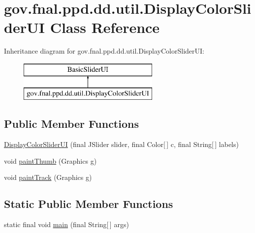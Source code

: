 \hypertarget{classgov_1_1fnal_1_1ppd_1_1dd_1_1util_1_1DisplayColorSliderUI}{\section{gov.\-fnal.\-ppd.\-dd.\-util.\-Display\-Color\-Slider\-U\-I Class Reference}
\label{classgov_1_1fnal_1_1ppd_1_1dd_1_1util_1_1DisplayColorSliderUI}
}
Inheritance diagram for gov.\-fnal.\-ppd.\-dd.\-util.\-Display\-Color\-Slider\-U\-I\-:\begin{figure}[H]
\begin{center}
\leavevmode
\includegraphics[height=2.000000cm]{classgov_1_1fnal_1_1ppd_1_1dd_1_1util_1_1DisplayColorSliderUI}
\end{center}
\end{figure}
\subsection*{Public Member Functions}
\begin{DoxyCompactItemize}
\item 
\hyperlink{classgov_1_1fnal_1_1ppd_1_1dd_1_1util_1_1DisplayColorSliderUI_af5a1118730ccaa1fcfacbfd5aee2639b}{Display\-Color\-Slider\-U\-I} (final J\-Slider slider, final Color\mbox{[}$\,$\mbox{]} c, final String\mbox{[}$\,$\mbox{]} labels)
\item 
void \hyperlink{classgov_1_1fnal_1_1ppd_1_1dd_1_1util_1_1DisplayColorSliderUI_a56976b17434c91683f08a2fdc8050298}{paint\-Thumb} (Graphics g)
\item 
void \hyperlink{classgov_1_1fnal_1_1ppd_1_1dd_1_1util_1_1DisplayColorSliderUI_a50ba5c92e6d6092f1114a72d2548d57e}{paint\-Track} (Graphics g)
\end{DoxyCompactItemize}
\subsection*{Static Public Member Functions}
\begin{DoxyCompactItemize}
\item 
static final void \hyperlink{classgov_1_1fnal_1_1ppd_1_1dd_1_1util_1_1DisplayColorSliderUI_a2a37edccb82c9a4241a6c58e7a4c5e0a}{main} (final String\mbox{[}$\,$\mbox{]} args)
\end{DoxyCompactItemize}
